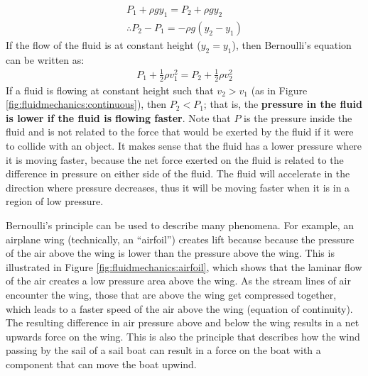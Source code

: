 {{\begin{align*}
P_1 + \rho g y_1= P_2 + \rho g y_2\\
\therefore P_2 - P_1 = - \rho g (y_2 - y_1)
\end{align*}
If the flow of the fluid is at constant height ($y_2=y_1$), then Bernoulli's equation can be written as:
\begin{align*}
P_1 +\frac{1}{2}\rho v_1^2 = P_2 + \frac{1}{2}\rho v_2^2 
\end{align*}
If a fluid is flowing at constant height such that $v_2 > v_1$ (as in Figure \ref{fig:fluidmechanics:continuous}), then $P_2<P_1$; that is, the \textbf{pressure in the fluid is lower if the fluid is flowing faster}. Note that $P$ is the pressure inside the fluid and is not related to the force that would be exerted by the fluid if it were to collide with an object. It makes sense that the fluid has a lower pressure where it is moving faster, because the net force exerted on the fluid is related to the difference in pressure on either side of the fluid. The fluid will accelerate in the direction where pressure decreases, thus it will be moving faster when it is in a region of low pressure.

Bernoulli's principle can be used to describe many phenomena. For example, an airplane wing (technically, an ``airfoil'') creates lift because because the pressure of the air above the wing is lower than the pressure above the wing. This is illustrated in Figure \ref{fig:fluidmechanics:airfoil}, which shows that the laminar flow of the air creates a low pressure area above the wing. As the stream lines of air encounter the wing, those that are above the wing get compressed together, which leads to a faster speed of the air above the wing (equation of continuity). The resulting difference in air pressure above and below the wing results in a net upwards force on the wing. This is also the principle that describes how the wind passing by the sail of a sail boat can result in a force on the boat with a component that can move the boat upwind.

}}
